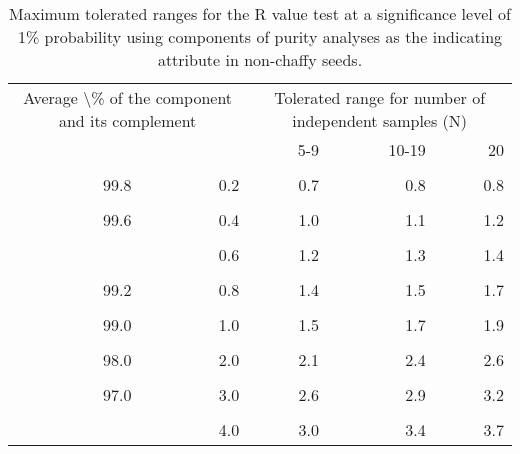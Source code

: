 \documentclass[
]{book}
\begin{document}
\begin{longtable}[t]{rrrrr}
\caption{\label{tab:other-seeds-r-non-chaffy}Maximum tolerated ranges for the R value test at a significance level of 1\% probability using components of purity analyses as the indicating attribute in non-chaffy seeds.}\\
\toprule
\multicolumn{2}{c}{Average \textbackslash{}\% of the component and its complement} & \multicolumn{3}{c}{Tolerated range for number of independent samples (N)} \\
\cmidrule(l{3pt}r{3pt}){1-2} \cmidrule(l{3pt}r{3pt}){3-5}
 &  & 5-9 & 10-19 & 20\\
\midrule
\cellcolor{gray!6}{99.9} & \cellcolor{gray!6}{0.1} & \cellcolor{gray!6}{0.5} & \cellcolor{gray!6}{0.5} & \cellcolor{gray!6}{0.6}\\
99.8 & 0.2 & 0.7 & 0.8 & 0.8\\
\cellcolor{gray!6}{99.7} & \cellcolor{gray!6}{0.3} & \cellcolor{gray!6}{0.8} & \cellcolor{gray!6}{0.9} & \cellcolor{gray!6}{1.0}\\
99.6 & 0.4 & 1.0 & 1.1 & 1.2\\
\cellcolor{gray!6}{99.5} & \cellcolor{gray!6}{0.5} & \cellcolor{gray!6}{1.1} & \cellcolor{gray!6}{1.2} & \cellcolor{gray!6}{1.3}\\
\addlinespace
99.4 & 0.6 & 1.2 & 1.3 & 1.4\\
\cellcolor{gray!6}{99.3} & \cellcolor{gray!6}{0.7} & \cellcolor{gray!6}{1.3} & \cellcolor{gray!6}{1.4} & \cellcolor{gray!6}{1.6}\\
99.2 & 0.8 & 1.4 & 1.5 & 1.7\\
\cellcolor{gray!6}{99.1} & \cellcolor{gray!6}{0.9} & \cellcolor{gray!6}{1.4} & \cellcolor{gray!6}{1.6} & \cellcolor{gray!6}{1.8}\\
99.0 & 1.0 & 1.5 & 1.7 & 1.9\\
\addlinespace
\cellcolor{gray!6}{98.5} & \cellcolor{gray!6}{1.5} & \cellcolor{gray!6}{1.9} & \cellcolor{gray!6}{2.1} & \cellcolor{gray!6}{2.3}\\
98.0 & 2.0 & 2.1 & 2.4 & 2.6\\
\cellcolor{gray!6}{97.5} & \cellcolor{gray!6}{2.5} & \cellcolor{gray!6}{2.4} & \cellcolor{gray!6}{2.7} & \cellcolor{gray!6}{2.9}\\
97.0 & 3.0 & 2.6 & 2.9 & 3.2\\
\cellcolor{gray!6}{96.5} & \cellcolor{gray!6}{3.5} & \cellcolor{gray!6}{2.8} & \cellcolor{gray!6}{3.1} & \cellcolor{gray!6}{3.4}\\
\addlinespace
96.0 & 4.0 & 3.0 & 3.4 & 3.7\\

\end{longtable}
\end{document}
